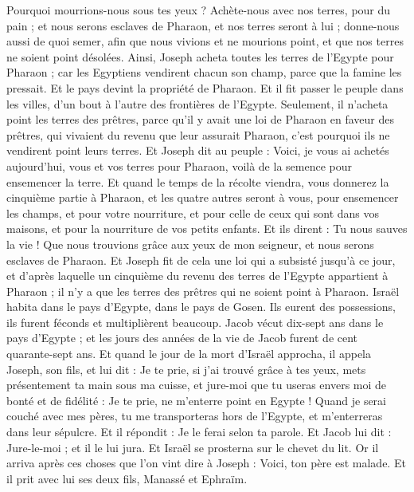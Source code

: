 \begin{multicols}{2}
Pourquoi mourrions-nous sous tes yeux ? Achète-nous avec nos terres, pour du pain ; et nous serons esclaves de Pharaon, et nos terres seront à lui ; donne-nous aussi de quoi semer, afin que nous vivions et ne mourions point, et que nos terres ne soient point désolées.
Ainsi, Joseph acheta toutes les terres de l’Egypte pour Pharaon ; car les Egyptiens vendirent chacun son champ, parce que la famine les pressait. Et le pays devint la propriété de Pharaon.
Et il fit passer le peuple dans les villes, d’un bout à l’autre des frontières de l’Egypte.
Seulement, il n’acheta point les terres des prêtres, parce qu’il y avait une loi de Pharaon en faveur des prêtres, qui vivaient du revenu que leur assurait Pharaon, c’est pourquoi ils ne vendirent point leurs terres.
Et Joseph dit au peuple : Voici, je vous ai achetés aujourd'hui, vous et vos terres pour Pharaon, voilà de la semence pour ensemencer la terre.
Et quand le temps de la récolte viendra, vous donnerez la cinquième partie à Pharaon, et les quatre autres seront à vous, pour ensemencer les champs, et pour votre nourriture, et pour celle de ceux qui sont dans vos maisons, et pour la nourriture de vos petits enfants.
Et ils dirent : Tu nous sauves la vie ! Que nous trouvions grâce aux yeux de mon seigneur, et nous serons esclaves de Pharaon.
Et Joseph fit de cela une loi qui a subsisté jusqu’à ce jour, et d’après laquelle un cinquième du revenu des terres de l’Egypte appartient à Pharaon ; il n’y a que les terres des prêtres qui ne soient point à Pharaon.
Israël habita dans le pays d’Egypte, dans le pays de Gosen. Ils eurent des possessions, ils furent féconds et multiplièrent beaucoup.
Jacob vécut dix-sept ans dans le pays d’Egypte ; et les jours des années de la vie de Jacob furent de cent quarante-sept ans.
Et quand le jour de la mort d'Israël approcha, il appela Joseph, son fils, et lui dit : Je te prie, si j'ai trouvé grâce à tes yeux, mets présentement ta main sous ma cuisse, et jure-moi que tu useras envers moi de bonté et de fidélité : Je te prie, ne m'enterre point en Egypte !
Quand  je serai couché avec mes pères, tu me transporteras hors de l'Egypte, et m'enterreras dans leur sépulcre. Et il répondit : Je le ferai selon ta parole.
Et Jacob lui dit : Jure-le-moi ; et il le lui jura. Et Israël se prosterna sur le chevet du lit.
\VerseOne{}Or il arriva après ces choses que l'on vint dire à Joseph : Voici, ton père est malade. Et il prit avec lui ses deux fils, Manassé et Ephraïm.

\end{multicols}
